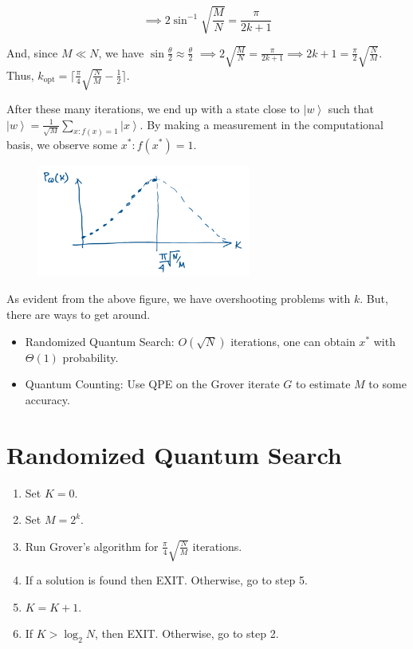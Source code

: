 \documentclass[11.5pt, paper=a4]{article}
\theoremstyle{definition}
\numberwithin{theorem}{section}
\newcommand{\ket}[1]{\ensuremath{\left|#1\right\rangle}}
\begin{document}
$$\implies 2 \sin^{-1} \sqrt{\frac{M}{N}} = \frac{\pi}{2k + 1}$$

And, since $M \ll N$, we have $\sin \frac{\theta}{2} \approx \frac{\theta}{2}$ $\implies 2 \sqrt{\frac{M}{N}} = \frac{\pi}{2k + 1} \implies 2k + 1 = \frac{\pi}{2}\sqrt{\frac{N}{M}}$. Thus, $k_{\text{opt}} = \lceil{\frac{\pi}{4}\sqrt{\frac{N}{M}} - \frac{1}{2}}\rceil$. \newline

After these many iterations, we end up with a state close to $\ket{w}$ such that $\ket{w} = \frac{1}{\sqrt M} \sum_{x: f(x) = 1} \ket{x}$. By making a measurement in the computational basis, we observe some $x^*: f(x^*) = 1$.

\begin{figure}[H]
    \centering
    \includegraphics[width=70mm]{images/3.png}
\end{figure}

As evident from the above figure, we have overshooting problems with $k$. But, there are ways to get around.

\begin{itemize}
    \item Randomized Quantum Search: $O(\sqrt N)$ iterations, one can obtain $x^*$ with $\Theta{(1)}$ probability.
    \item Quantum Counting: Use QPE on the Grover iterate $G$ to estimate $M$ to some accuracy.
\end{itemize}

\section{Randomized Quantum Search}
\begin{enumerate}
    \item Set $K = 0$.
    \item Set $M = 2^k$.
    \item Run Grover's algorithm for $\frac{\pi}{4}\sqrt{\frac{N}{M}}$ iterations.
    \item If a solution is found then EXIT. Otherwise, go to step 5.
    \item $K = K + 1$.
    \item If $K > \log_2 N$, then EXIT. Otherwise, go to step 2.
\end{enumerate}
\end{document}
